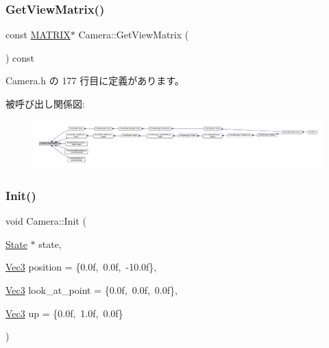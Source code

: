 \subsubsection{\texorpdfstring{Get\+View\+Matrix()}{GetViewMatrix()}}
{\footnotesize\ttfamily const \mbox{\hyperlink{_vector3_d_8h_a032295cd9fb1b711757c90667278e744}{M\+A\+T\+R\+IX}}$\ast$ Camera\+::\+Get\+View\+Matrix (\begin{DoxyParamCaption}{ }\end{DoxyParamCaption}) const\hspace{0.3cm}{\ttfamily [inline]}}



 Camera.\+h の 177 行目に定義があります。

被呼び出し関係図\+:
\nopagebreak
\begin{figure}[H]
\begin{center}
\leavevmode
\includegraphics[width=350pt]{class_camera_aa472374f61480c5a9dff89d30be029f4_icgraph}
\end{center}
\end{figure}
\mbox{\label{class_camera_a03e3ca8b70417632f7b1b581426ec66d}} 
\subsubsection{\texorpdfstring{Init()}{Init()}}
{\footnotesize\ttfamily void Camera\+::\+Init (\begin{DoxyParamCaption}\item[{\mbox{\hyperlink{class_camera_1_1_state}{State}} $\ast$}]{state,  }\item[{\mbox{\hyperlink{_vector3_d_8h_ab16f59e4393f29a01ec8b9bbbabbe65d}{Vec3}}}]{position = {\ttfamily \{0.0f,~0.0f,~-\/10.0f\}},  }\item[{\mbox{\hyperlink{_vector3_d_8h_ab16f59e4393f29a01ec8b9bbbabbe65d}{Vec3}}}]{look\+\_\+at\+\_\+point = {\ttfamily \{0.0f,~0.0f,~0.0f\}},  }\item[{\mbox{\hyperlink{_vector3_d_8h_ab16f59e4393f29a01ec8b9bbbabbe65d}{Vec3}}}]{up = {\ttfamily \{0.0f,~1.0f,~0.0f\}} }\end{DoxyParamCaption})}



